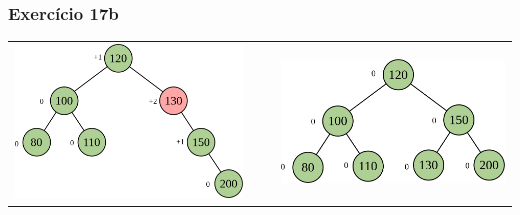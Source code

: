 \documentclass[aspectratio=169]{beamer}
\begin{document}
\begin{frame}[fragile]\frametitle{Exercício 17b}
\begin{tabular}{lll}
\includegraphics[height=0.45\paperheight]{imagens/avl14c.png} & ~ ~ &
\includegraphics[height=0.33\paperheight]{imagens/avl14d.png} \\
\end{tabular}
\end{frame}
\end{document}
